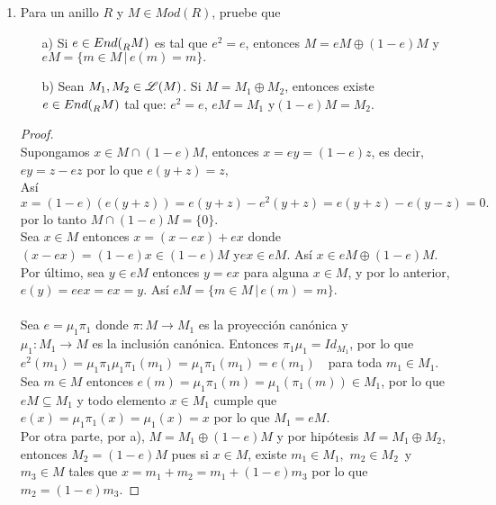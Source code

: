 \documentclass{article}
\begin{document}
\begin{enumerate}[label=\textbf{Ej \arabic*.}]
\item Para un anillo $R$ y $M\in Mod(R)$, pruebe que 
\begin{itemize}
\item[a)] Si $e\in End(\prescript{}{R}{M})$ es tal que $e^2=e$, entonces $M=eM\oplus (1-e)M$ y $eM=\{m\in M\,|\, e(m)=m\}.$
\item[b)] Sean $M_1,M_2\in \mathscr{L}(M)$. Si $M=M_1\oplus M_2$, entonces existe\\ $e\in End(\prescript{}{R}{M})$ tal que: $e^2=e$, $eM=M_1$\quad
y\quad $(1-e)M=M_2$.
\end{itemize}
\begin{proof}
\\
Supongamos $x\in M\cap(1-e)M$, entonces $x=ey=(1-e)z$, es decir, $ey=z-ez$ por lo que $e(y+z)=z$,\\
Así \[x=(1-e)(e(y+z))=e(y+z)-e^2(y+z)=e(y+z)-e(y-z)=0.
\]
por lo tanto $M\cap (1-e)M=\{0\}.$\\

Sea $x\in M$ entonces $x=(x-ex)+ex$ donde $(x-ex)=(1-e)x\in (1-e)M$ y\quad $ex\in eM$. Así $x\in eM\oplus (1-e)M$.\\

Por último, sea $y\in eM$ entonces $y=ex$ para alguna $x\in M$, y por lo anterior, $e(y)=eex=ex=y$. Así $eM=\{m\in M\,|\, e(m)=m\}.$\\
\\
Sea $e=\mu_1\pi_1$ donde $\pi\colon M\longrightarrow M_1$ es la proyección canónica y \\$\mu_1\colon M_1\longrightarrow M$ es la 
inclusión canónica. Entonces $\pi_1\mu_1=Id_{M_1}$, por lo que $e^2(m_1)=\mu_1\pi_1\mu_1\pi_1(m_1)=\mu_1\pi_1(m_1)=e(m_1)$ \,\,
para toda $m_1\in M_1$.\\

Sea $m\in M$ entonces $e(m)=\mu_1\pi_1(m)=\mu_1(\pi_1(m))\in M_1$, por lo que $eM\subseteq M_1$ y todo elemento $x\in M_1$ cumple 
que\\$e(x)=\mu_1\pi_1(x)=\mu_1(x)=x$ por lo que $M_1=eM$.\\

Por otra parte, por a), $M=M_1\oplus(1-e)M$ y por hipótesis $M=M_1\oplus M_2$, entonces $M_2=(1-e)M$ pues si $x\in M$, existe $m_1\in M_1,\,\,
m_2\in M_2\,$ y $m_3\in M$ tales que $x=m_1+m_2=m_1+(1-e)m_3$ por lo que $m_2=(1-e)m_3$.
\end{proof}


\end{enumerate}
\end{document}

